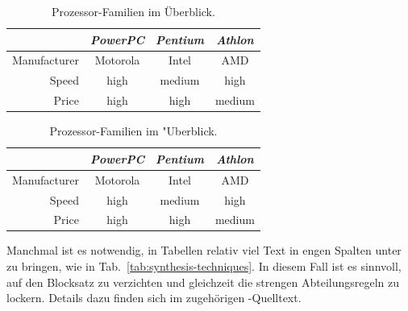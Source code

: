 \begin{table}
\caption{Prozessor-Familien im Überblick.}
\label{tab:processors}
\centering
\setlength{\tabcolsep}{5mm}	%
\def\arraystretch{1.25}		%
\begin{tabular}{|r||c|c|c|} \hline
& \emph{PowerPC} & \emph{Pentium} & \emph{Athlon} \\
\hline\hline
Manufacturer & Motorola & Intel & AMD \\
\hline
Speed & high & medium & high   \\
\hline
Price & high & high   & medium \\
\hline
\end{tabular}
\end{table}

\begin{program}
\caption{\latex\ Quelltext zu Tab.~\ref{tab:processors}.
Die Erzeugung des dargestellten Listings selbst ist in Abschn.\ \ref{sec:programmtexte} beschrieben.}
\label{prog:processors-source}
%
\begin{LaTeXCode}
\begin{table}
\caption{Prozessor-Familien im "Uberblick.}
\label{tab:processors}
\centering
\setlength{\tabcolsep}{5mm}	%
\def\arraystretch{1.25}		%
\begin{tabular}{|r||c|c|c|} \hline
& \emph{PowerPC} & \emph{Pentium} & \emph{Athlon} \\
\hline\hline
Manufacturer & Motorola & Intel & AMD \\
\hline
Speed & high & medium & high   \\
\hline
Price & high & high   & medium \\
\hline
\end{tabular}
\end{table}
\end{LaTeXCode}
%
\end{program}

Manchmal ist es notwendig, in Tabellen relativ viel Text in engen Spalten
unter zu bringen, wie in Tab.~\ref{tab:synthesis-techniques}. In diesem Fall
ist es sinnvoll, auf den Blocksatz zu verzichten und gleichzeit die
strengen Abteilungsregeln zu lockern. Details dazu finden sich im zugehörigen
\latex-Quelltext.


